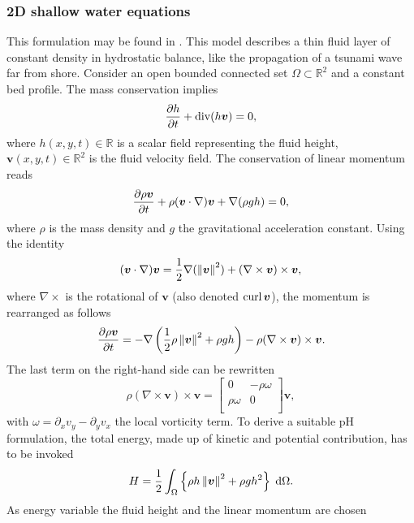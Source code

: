 \subsubsection{2D shallow water equations}\label{sec:shallowwater}
This formulation may be found in \cite[Section 6.2]{cardoso2016}. This model describes a thin fluid layer of constant density in hydrostatic balance, like the propagation of a tsunami wave far from shore. Consider an open bounded connected set $\Omega \subset \mathbb{R}^2$ and a constant bed profile. The mass conservation implies
\begin{equation*}
\diffp{h}{t} + \div(h\bm{v}) = 0,
\end{equation*}
where $h(x,y,t) \in \mathbb{R}$ is a scalar field representing the fluid height, $\bm{v}(x,y,t) \in \mathbb{R}^2$ is the fluid velocity field. The conservation of linear momentum reads
\begin{equation*}
\diffp{\rho\bm{v}}{t} + \rho (\bm{v} \cdot \nabla) \bm{v} + \nabla(\rho g h) = 0,
\end{equation*}
where $\rho$ is the mass density and $g$ the gravitational acceleration constant. Using the identity
\begin{equation*}
(\bm{v} \cdot \nabla) \bm{v} = \frac{1}{2} \nabla(\left\|\bm{v}\right\|^2)  + (\nabla \times \bm{v}) \times \bm{v}, 
\end{equation*}
where $\nabla \times$ is the rotational of $\bm{v}$ (also denoted $\operatorname*{curl} \bm{v}$), the momentum is rearranged as follows
\begin{equation*}
\diffp{\rho \bm{v}}{t} = -\nabla\left(\frac{1}{2}\rho \norm{\bm{v}}^2 + \rho g h\right) - \rho (\nabla \times \bm{v}) \times \bm{v}.
\end{equation*}
The last term on the right-hand side can be rewritten
\begin{equation*}
\rho (\nabla \times \bm{v}) \times \bm{v} =   
\begin{bmatrix}
0 & -\rho\omega \\
\rho\omega & 0 \\
\end{bmatrix}
\bm{v},
\end{equation*}
with $\omega = \partial_x v_y - \partial_y v_x$ the local vorticity term. To derive a suitable pH formulation, the total energy, made up of kinetic and potential contribution, has to be invoked
\begin{equation*}
H = \energy{\rho h \norm{\bm{v}}^2 + \rho g h^2}.
\end{equation*}
As energy variable the fluid height and the linear momentum are chosen
